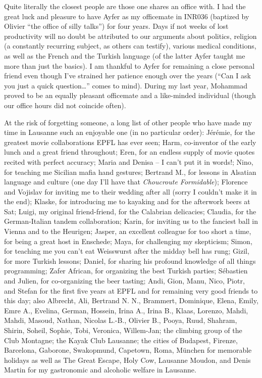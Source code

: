 Quite literally the closest people are those one shares an office with. I had
the great luck and pleasure to have Ayfer as my officemate in INR036 (baptized
by Olivier ``the office of silly talks'') for four years. Days if not weeks of
lost productivity will no doubt be attributed to our arguments about politics,
religion (a constantly recurring subject, as others can testify), various
medical conditions, as well as the French and the Turkish language (of the
latter Ayfer taught me more than just the basics). I am thankful to Ayfer for
remaining a close personal friend even though I've strained her patience enough
over the years (``Can I ask you just a quick question\dots'' comes to mind).
During my last year, Mohammad proved to be an equally pleasant officemate and a
like-minded individual (though our office hours did not coincide often). 

At the risk of forgetting someone, a long list of other people who have made my
time in Lausanne such an enjoyable one (in no particular order): Jérémie, for
the greatest movie collaborations EPFL has ever seen; Harm, co-inventor of the
early lunch and a great friend throughout; Eren, for an endless supply of movie
quotes recited with perfect accuracy; Maria and Denisa -- I can't put it in
words!; Nino, for teaching me Sicilian mafia hand gestures; Bertrand M., for
lessons in Alsatian language and culture (one day I'll have that
\emph{Choucroute Formidable}); Florence and Vojislav for inviting me to their
wedding after all (sorry I couldn't make it in the end); Klaske, for introducing
me to kayaking and for the afterwork beers at Sat; Luigi, my original
friend-friend, for the Calabrian delicacies; Claudia, for the German-Italian
tandem collaboration; Karin, for inviting us to the fanciest ball in Vienna and
to the Heurigen; Jasper, an excellent colleague for too short a time, for being
a great host in Enschede; Maya, for challenging my skepticism; Simon, for
teaching me you can't eat Weisswurst after the midday bell has rung; Gizil, for
more Turkish lessons; Daniel, for sharing his profound knowledge of all things
programming; Zafer African, for organizing the best Turkish parties; Sébastien
and Julien, for co-organizing the beer tasting; Andi, Gion, Manu, Nico, Piotr,
and Stefan for the first five years at EPFL and for remaining very good friends
to this day; also Albrecht, Ali, Bertrand N. N., Brammert, Dominique, Elena,
Emily, Emre A., Evelina, German, Hossein, Irina A., Irina B., Klaas, Lorenzo,
Mahdi, Mahdi, Masoud, Nathan, Nicolas L.-B., Olivier B., Pooya, Ruud, Shahram,
Shirin, Soheil, Sophie, Tobi, Veronica, Willem-Jan; the climbing group of the
Club Montagne; the Kayak Club Lausanne; the cities of Budapest, Firenze,
Barcelona, Gaborone, Swakopmund, Capetown, Roma, München for memorable holidays
as well as The Great Escape, Holy Cow, Lausanne Moudon, and Denis Martin for my
gastronomic and alcoholic welfare in Lausanne. 

